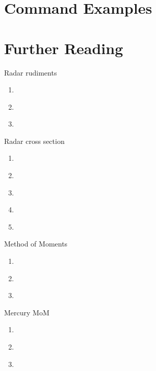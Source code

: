 \documentclass[10pt, oneside]{article}   	%
\begin{document}
\section{Command Examples}
		


\section{Further Reading}
Radar rudiments
\begin{enumerate}
	\item \cite{peebles2007radar}
	\item \cite{Handbook}
	\item \cite{kolosov1987}
\end{enumerate}
Radar cross section
\begin{enumerate}
	\item \cite{yuan2009efficient}
	\item \cite{fuhs1982radar}
	\item \cite{knott2004radar}
	\item \cite{crispin2013methods}
	\item \cite{madheswaran2012estimation}
\end{enumerate}
Method of Moments
\begin{enumerate}
	\item \cite{gibson2021method}
	\item \cite{lu2003comparison}
	\item \cite{yuan2009efficient}
\end{enumerate}
Mercury MoM
\begin{enumerate}
	\item \cite{Topa-2020-07-07}
	\item \cite{lu2003comparison}
	\item \cite{yuan2009efficient}
\end{enumerate}

	\printbibliography
%
% 
%
%
%
%
\end{document}
